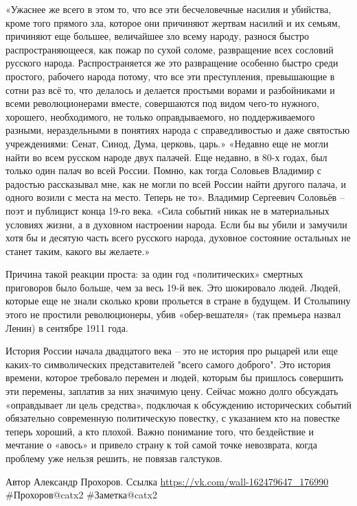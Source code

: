 «Ужаснее же всего в этом то, что все эти бесчеловечные насилия и убийства, кроме того прямого зла, которое они причиняют жертвам насилий и их семьям, причиняют еще большее, величайшее зло всему народу, разнося быстро распространяющееся, как пожар по сухой соломе, развращение всех сословий русского народа. Распространяется же это развращение особенно быстро среди простого, рабочего народа потому, что все эти преступления, превышающие в сотни раз всё то, что делалось и делается простыми ворами и разбойниками и всеми революционерами вместе, совершаются под видом чего-то нужного, хорошего, необходимого, не только оправдываемого, но поддерживаемого разными, нераздельными в понятиях народа с справедливостью и даже святостью учреждениями: Сенат, Синод, Дума, церковь, царь.»
«Недавно еще не могли найти во всем русском народе двух палачей. Еще недавно, в 80-х годах, был только один палач во всей России. Помню, как тогда Соловьев Владимир с радостью рассказывал мне, как не могли по всей России найти другого палача, и одного возили с места на место. Теперь не то». Владимир Сергеевич Соловьёв – поэт и публицист конца 19-го века.
«Сила событий никак не в материальных условиях жизни, а в духовном настроении народа. Если бы вы убили и замучили хотя бы и десятую часть всего русского народа, духовное состояние остальных не станет таким, какого вы желаете.»

Причина такой реакции проста: за один год «политических» смертных приговоров было больше, чем за весь 19-й век. Это шокировало людей. Людей, которые еще не знали сколько крови прольется в стране в будущем.
И Столыпину этого не простили революционеры, убив «обер-вешателя» (так премьера назвал Ленин) в сентябре 1911 года.

История России начала двадцатого века – это не история про рыцарей или еще каких-то символических представителей "всего самого доброго". Это история времени, которое требовало перемен и людей, которым бы пришлось совершить эти перемены, заплатив за них значимую цену. Сейчас можно долго обсуждать «оправдывает ли цель средства», подключая к обсуждению исторических событий обязательно современную политическую повестку, с указанием кто на повестке теперь хороший, а кто плохой. Важно понимание того, что бездействие и мечтание о «авось» и привело страну к той самой точке невозврата, когда проблему уже нельзя решить, не повязав галстуков.

Автор Александр Прохоров. Ссылка \url{https://vk.com/wall-162479647_176990}
\#Прохоров@catx2
\#Заметка@catx2
